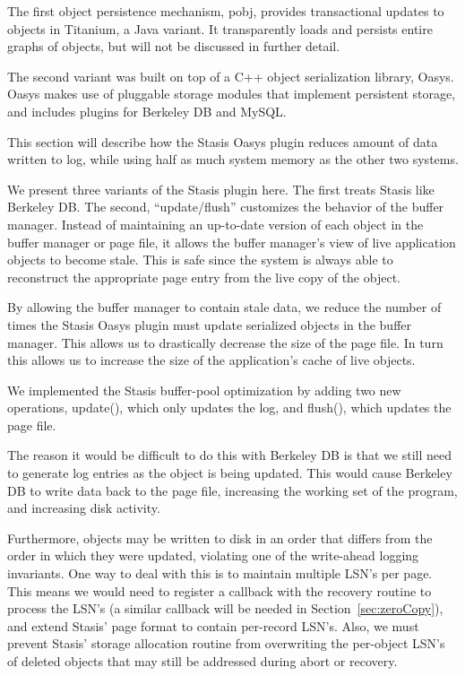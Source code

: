 \documentclass[letterpaper,twocolumn,10pt]{article}
\newcommand{\yad}{Stasis\xspace}
\newcommand{\yads}{Stasis'\xspace}
\newcommand{\oasys}{Oasys\xspace}
\begin{document}
The first object persistence mechanism, pobj, provides transactional updates to objects in
Titanium, a Java variant.  It transparently loads and persists
entire graphs of objects, but will not be discussed in further detail.

The second variant was built on top of a C++ object
serialization library, \oasys.  \oasys makes use of pluggable storage
modules that implement persistent storage, and includes plugins
for Berkeley DB and MySQL.  

This section will describe how the \yad
\oasys plugin reduces amount of data written to log, while using half as much system
memory as the other two systems.

We present three variants of the \yad plugin here.  The first treats \yad like
Berkeley DB.  The second, ``update/flush'' customizes the behavior of the buffer
manager.  Instead of maintaining an up-to-date version of each object
in the buffer manager or page file, it allows the buffer manager's
view of live application objects to become stale.  This is safe since
the system is always able to reconstruct the appropriate page entry
from the live copy of the object.

By allowing the buffer manager to contain stale data, we reduce the
number of times the \yad \oasys plugin must update serialized objects in the buffer manager.
This allows us to drastically decrease the
size of the page file.  In turn this allows us to increase the size of
the application's cache of live objects.

We implemented the \yad buffer-pool optimization by adding two new
operations, update(), which only updates the log, and flush(), which
updates the page file.  

The reason it would be difficult to do this with Berkeley DB is that
we still need to generate log entries as the object is being updated.
  This would cause Berkeley DB to write data back to the
page file, increasing the working set of the program, and increasing
disk activity.

Furthermore, objects may be written to disk in an
order that differs from the order in which they were updated, 
violating one of the write-ahead logging invariants.  One way to 
deal with this is to maintain multiple LSN's per page.  This means we would need to register a
callback with the recovery routine to process the LSN's (a similar
callback will be needed in Section~\ref{sec:zeroCopy}), and 
extend \yads page format to contain per-record LSN's.  
Also, we must prevent \yads storage allocation routine from overwriting the per-object 
LSN's of deleted objects that may still be addressed during abort or recovery.  
\end{document}
